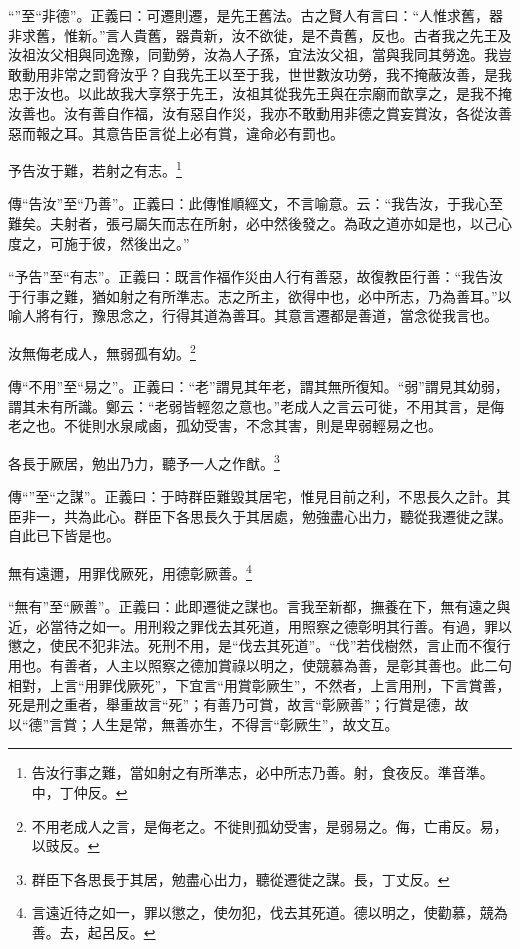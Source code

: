 {\noindent\shu{}\fzkt “”至“非德”。正義曰：可遷則遷，是先王舊法。古之賢人有言曰：“人惟求舊，器非求舊，惟新。”言人貴舊，器貴新，汝不欲徙，是不貴舊，反也。古者我之先王及汝祖汝父相與同逸豫，同勤勞，汝為人子孫，宜法汝父祖，當與我同其勞逸。我豈敢動用非常之罰脅汝乎？自我先王以至于我，世世數汝功勞，我不掩蔽汝善，是我忠于汝也。以此故我大享祭于先王，汝祖其從我先王與在宗廟而歆享之，是我不掩汝善也。汝有善自作福，汝有惡自作災，我亦不敢動用非德之賞妄賞汝，各從汝善惡而報之耳。其意告臣言從上必有賞，違命必有罰也。 \par}

予告汝于難，若射之有志。\footnote{告汝行事之難，當如射之有所準志，必中所志乃善。射，食夜反。準音準。中，丁仲反。}

{\noindent\zhuan{}\fzbyks 傳“告汝”至“乃善”。正義曰：此傳惟順經文，不言喻意。云：“我告汝，于我心至難矣。夫射者，張弓屬矢而志在所射，必中然後發之。為政之道亦如是也，以己心度之，可施于彼，然後出之。” \par}

{\noindent\shu{}\fzkt “予告”至“有志”。正義曰：既言作福作災由人行有善惡，故復教臣行善：“我告汝于行事之難，猶如射之有所準志。志之所主，欲得中也，必中所志，乃為善耳。”以喻人將有行，豫思念之，行得其道為善耳。其意言遷都是善道，當念從我言也。 \par}

汝無侮老成人，無弱孤有幼。\footnote{不用老成人之言，是侮老之。不徙則孤幼受害，是弱易之。侮，亡甫反。易，以豉反。}

{\noindent\zhuan{}\fzbyks 傳“不用”至“易之”。正義曰：“老”謂見其年老，謂其無所復知。“弱”謂見其幼弱，謂其未有所識。鄭云：“老弱皆輕忽之意也。”老成人之言云可徙，不用其言，是侮老之也。不徙則水泉咸鹵，孤幼受害，不念其害，則是卑弱輕易之也。 \par}

各長于厥居，勉出乃力，聽予一人之作猷。\footnote{群臣下各思長于其居，勉盡心出力，聽從遷徙之謀。長，丁丈反。}

{\noindent\zhuan{}\fzbyks 傳“”至“之謀”。正義曰：于時群臣難毀其居宅，惟見目前之利，不思長久之計。其臣非一，共為此心。群臣下各思長久于其居處，勉強盡心出力，聽從我遷徙之謀。自此已下皆是也。 \par}

無有遠邇，用罪伐厥死，用德彰厥善。\footnote{言遠近待之如一，罪以懲之，使勿犯，伐去其死道。德以明之，使勸慕，競為善。去，起呂反。}

{\noindent\shu{}\fzkt “無有”至“厥善”。正義曰：此即遷徙之謀也。言我至新都，撫養在下，無有遠之與近，必當待之如一。用刑殺之罪伐去其死道，用照察之德彰明其行善。有過，罪以懲之，使民不犯非法。死刑不用，是“伐去其死道”。“伐”若伐樹然，言止而不復行用也。有善者，人主以照察之德加賞祿以明之，使競慕為善，是彰其善也。此二句相對，上言“用罪伐厥死”，下宜言“用賞彰厥生”，不然者，上言用刑，下言賞善，死是刑之重者，舉重故言“死”；有善乃可賞，故言“彰厥善”；行賞是德，故以“德”言賞；人生是常，無善亦生，不得言“彰厥生”，故文互。 \par}

